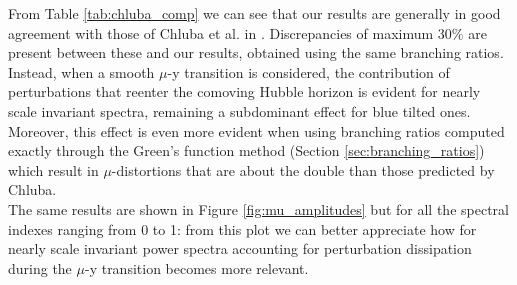 From Table \ref{tab:chluba_comp} we can see that our results are generally in good agreement with those of Chluba et al. in \cite{Chluba_tens_diss}. Discrepancies of maximum $30\%$ are present between these and our results, obtained using the same branching ratios. Instead, when a smooth $\mu$-y transition is considered, the contribution of perturbations that reenter the comoving Hubble horizon is evident for nearly scale invariant spectra, remaining a subdominant effect for blue tilted ones. Moreover, this effect is even more evident when using branching ratios computed exactly through the Green's function method (Section \ref{sec:branching_ratios}) which result in $\mu$-distortions that are about the double than those predicted by Chluba.\\ The same results are shown in Figure \ref{fig:mu_amplitudes} but for all the spectral indexes ranging from 0 to 1: from this plot we can better appreciate how for nearly scale invariant power spectra accounting for perturbation dissipation during the $\mu$-y transition becomes more relevant. 

